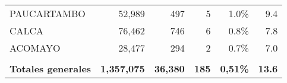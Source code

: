 \begin{tabular}{lrrrrr}
	\cellcolor[HTML]{FFFC9E}PAUCARTAMBO   & 52,989                                                         & 497                                                                             & 5                                                              & 1.0\%                                                                  & 9.4                                                                                                                                \\
	\cellcolor[HTML]{FFFC9E}CALCA         & 76,462                                                         & 746                                                                             & 6                                                              & 0.8\%                                                                  & 7.8                                                                                                                                \\
	\cellcolor[HTML]{FFFC9E}ACOMAYO       & 28,477                                                         & 294                                                                             & 2                                                              & 0.7\%                                                                  & 7.0                                                                                                                                \\
	&                                                                &                                                                                 &                                                                &                                                                        &                                                                                                                                    \\
	\rowcolor[HTML]{ECF4FF} 
	\textbf{Totales generales}            & \textbf{1,357,075}                                             & \textbf{36,380}                                                                 & \textbf{185}                                                   & \textbf{0,51\%}                                                        & \textbf{13.6}                                                                                                                     
\end{tabular}